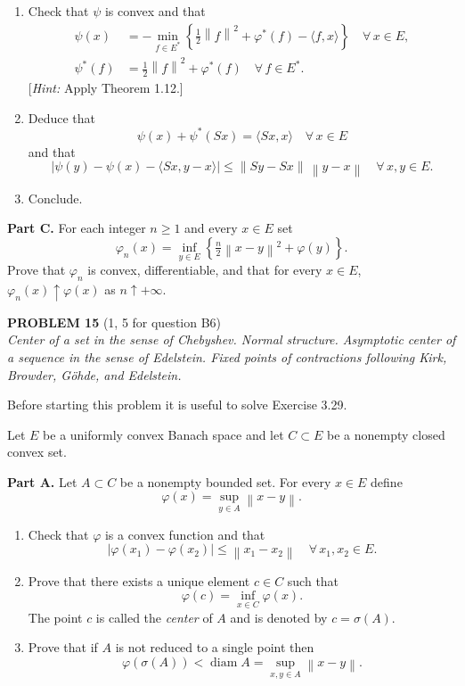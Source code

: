 \documentclass[12pt]{article}
\newcommand{\norm}[1]{\left\|#1\right\|}
\newcommand{\abs}[1]{\left|#1\right|}
\newcommand{\ip}[2]{\langle #1, #2 \rangle}
\begin{document}
\begin{enumerate}
\item Check that $\psi$ is convex and that
\begin{align*}
\psi(x) &= -\min_{f \in E^*}\left\{\tfrac{1}{2}\norm{f}^2 + \varphi^*(f) - \ip{f}{x}\right\} \quad \forall\, x \in E, \tag{i}\\
\psi^*(f) &= \tfrac{1}{2}\norm{f}^2 + \varphi^*(f) \quad \forall\, f \in E^*. \tag{ii}
\end{align*}
[\textit{Hint:} Apply Theorem 1.12.]

\item Deduce that
\[
\psi(x) + \psi^*(Sx) = \ip{Sx}{x} \quad \forall\, x \in E
\]
and that
\[
\abs{\psi(y) - \psi(x) - \ip{Sx}{y-x}} \le \norm{Sy - Sx}\,\norm{y-x} \quad \forall\, x, y \in E.
\]

\item Conclude.
\end{enumerate}

\noindent\textbf{Part C.} For each integer $n \ge 1$ and every $x \in E$ set
\[
\varphi_n(x) = \inf_{y \in E}\left\{\tfrac{n}{2}\norm{x-y}^2 + \varphi(y)\right\}.
\]
Prove that $\varphi_n$ is convex, differentiable, and that for every $x \in E$, $\varphi_n(x) \uparrow \varphi(x)$
as $n \uparrow +\infty$.


\bigskip

\noindent\textbf{PROBLEM 15} (1, 5 for question B6)\\[4pt]
\textit{Center of a set in the sense of Chebyshev. Normal structure.
Asymptotic center of a sequence in the sense of Edelstein. Fixed points
of contractions following Kirk, Browder, G\"{o}hde, and Edelstein.}

\medskip

\noindent Before starting this problem it is useful to solve Exercise 3.29.

\medskip

Let $E$ be a uniformly convex Banach space and let $C \subset E$ be a nonempty closed
convex set.

\medskip

\noindent\textbf{Part A.} Let $A \subset C$ be a nonempty bounded set. For every $x \in E$ define
\[
\varphi(x) = \sup_{y \in A} \norm{x - y}.
\]

\begin{enumerate}
\item Check that $\varphi$ is a convex function and that
\[
\abs{\varphi(x_1) - \varphi(x_2)} \le \norm{x_1 - x_2} \quad \forall\, x_1, x_2 \in E.
\]

\item Prove that there exists a unique element $c \in C$ such that
\[
\varphi(c) = \inf_{x \in C} \varphi(x).
\]
The point $c$ is called the \emph{center} of $A$ and is denoted by $c = \sigma(A)$.

\item Prove that if $A$ is not reduced to a single point then
\[
\varphi(\sigma(A)) < \operatorname{diam} A = \sup_{x,y \in A} \norm{x-y}.
\]
\end{enumerate}
\end{document}
